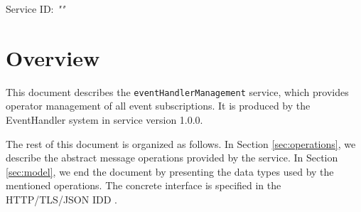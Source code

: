 \documentclass[a4paper]{arrowhead}
\begin{document}
\sloppy

\ArrowheadSetup

\begin{center}
  \vspace*{1cm}
  \huge{\arrowtitle}

  \vspace*{0.2cm}
  \LARGE{\arrowtype}
  \vspace*{1cm}

  \Large{Service ID: \textit{"\arrowid"}}

  \vspace*{\fill}


  \vspace*{1cm}
  \vspace*{\fill}

  \begin{abstract}
    This document describes the \texttt{event\allowbreak{}Handler\allowbreak{}Management} service, version 1.0.0, produced by the EventHandler support system of Arrowhead 5.2.2.
  \end{abstract}

  \vspace*{1cm}
\end{center}

\newpage

\tableofcontents
\newpage

\section{Overview}
\label{sec:overview}

This document describes the \texttt{event\allowbreak{}Handler\allowbreak{}Management} service, which provides operator management of all event subscriptions.
It is produced by the EventHandler system \cite{eh-sysd} in service version 1.0.0.

The rest of this document is organized as follows.
In Section \ref{sec:operations}, we describe the abstract message operations provided by the service.
In Section \ref{sec:model}, we end the document by presenting the data types used by the mentioned operations.
The concrete interface is specified in the HTTP/TLS/JSON IDD \cite{eh-eventHandlerManagement-http-idd}.
\end{document}
